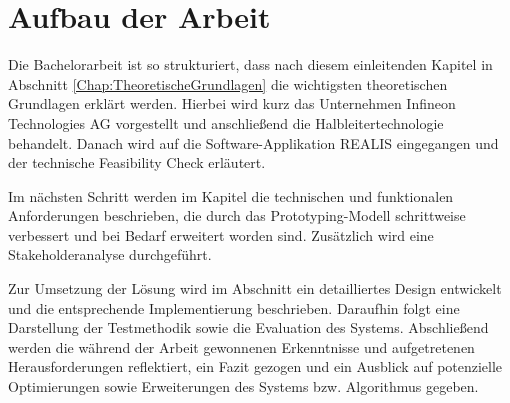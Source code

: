 \section{Aufbau der Arbeit}
Die Bachelorarbeit ist so strukturiert, dass nach diesem einleitenden Kapitel in Abschnitt \ref{Chap:TheoretischeGrundlagen} die wichtigsten theoretischen Grundlagen erklärt werden. 
Hierbei wird kurz das Unternehmen Infineon Technologies AG vorgestellt und anschließend die Halbleitertechnologie behandelt. Danach wird auf die Software-Applikation \gls{REALIS} eingegangen und der technische Feasibility Check erläutert.

Im nächsten Schritt werden im Kapitel \textit{} die technischen und funktionalen Anforderungen beschrieben, die durch das Prototyping-Modell schrittweise verbessert und bei Bedarf erweitert worden sind. Zusätzlich wird eine Stakeholderanalyse durchgeführt.

Zur Umsetzung der Lösung wird im Abschnitt \textit{} ein detailliertes Design entwickelt und die entsprechende Implementierung beschrieben. Daraufhin folgt eine Darstellung der Testmethodik sowie die Evaluation des Systems. Abschließend werden die während der Arbeit gewonnenen Erkenntnisse und aufgetretenen Herausforderungen reflektiert, ein Fazit gezogen und ein Ausblick auf potenzielle Optimierungen sowie Erweiterungen des Systems bzw. Algorithmus gegeben.
